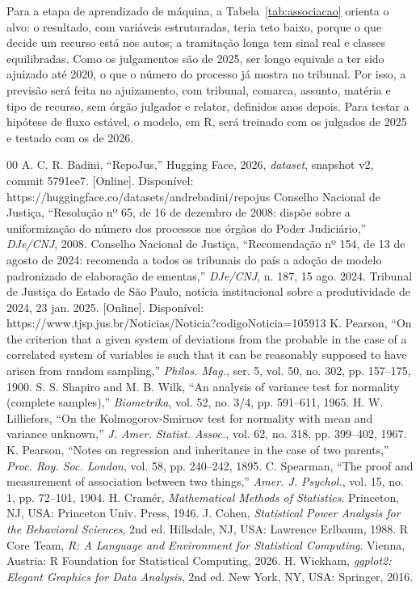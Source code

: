 \documentclass[conference]{IEEEtran}
\begin{document}
Para a etapa de aprendizado de máquina, a Tabela~\ref{tab:associacao} orienta
o alvo: o resultado, com variáveis estruturadas, teria teto baixo, porque o que
decide um recurso está nos autos; a tramitação longa tem sinal real e classes
equilibradas. Como os julgamentos são de 2025, ser longo equivale a ter sido
ajuizado até 2020, o que o número do processo já mostra no tribunal. Por
isso, a previsão será feita no ajuizamento, com tribunal, comarca, assunto,
matéria e tipo de recurso, sem órgão julgador e relator, definidos anos depois.
Para testar a hipótese de fluxo estável, o modelo, em R, será treinado com os
julgados de 2025 e testado com os de 2026.

\begin{thebibliography}{00}
 A. C. R. Badini, ``RepoJus,'' Hugging Face, 2026, \textit{dataset}, snapshot v2, commit 5791ee7. [Online]. Disponível: https://huggingface.co/\allowbreak datasets/\allowbreak andrebadini/\allowbreak repojus
 Conselho Nacional de Justiça, ``Resolução nº 65, de 16 de dezembro de 2008: dispõe sobre a uniformização do número dos processos nos órgãos do Poder Judiciário,'' \textit{DJe/CNJ}, 2008.
 Conselho Nacional de Justiça, ``Recomendação nº 154, de 13 de agosto de 2024: recomenda a todos os tribunais do país a adoção de modelo padronizado de elaboração de ementas,'' \textit{DJe/CNJ}, n. 187, 15 ago. 2024.
 Tribunal de Justiça do Estado de São Paulo, notícia institucional sobre a produtividade de 2024, 23 jan. 2025. [Online]. Disponível: https://www.tjsp.jus.br/\allowbreak Noticias/\allowbreak Noticia?codigoNoticia=105913
 K. Pearson, ``On the criterion that a given system of deviations from the probable in the case of a correlated system of variables is such that it can be reasonably supposed to have arisen from random sampling,'' \textit{Philos. Mag.}, ser. 5, vol. 50, no. 302, pp. 157--175, 1900.
 S. S. Shapiro and M. B. Wilk, ``An analysis of variance test for normality (complete samples),'' \textit{Biometrika}, vol. 52, no. 3/4, pp. 591--611, 1965.
 H. W. Lilliefors, ``On the Kolmogorov-Smirnov test for normality with mean and variance unknown,'' \textit{J. Amer. Statist. Assoc.}, vol. 62, no. 318, pp. 399--402, 1967.
 K. Pearson, ``Notes on regression and inheritance in the case of two parents,'' \textit{Proc. Roy. Soc. London}, vol. 58, pp. 240--242, 1895.
 C. Spearman, ``The proof and measurement of association between two things,'' \textit{Amer. J. Psychol.}, vol. 15, no. 1, pp. 72--101, 1904.
 H. Cramér, \textit{Mathematical Methods of Statistics}. Princeton, NJ, USA: Princeton Univ. Press, 1946.
 J. Cohen, \textit{Statistical Power Analysis for the Behavioral Sciences}, 2nd ed. Hillsdale, NJ, USA: Lawrence Erlbaum, 1988.
 R Core Team, \textit{R: A Language and Environment for Statistical Computing}. Vienna, Austria: R Foundation for Statistical Computing, 2026.
 H. Wickham, \textit{ggplot2: Elegant Graphics for Data Analysis}, 2nd ed. New York, NY, USA: Springer, 2016.
\end{thebibliography}
\end{document}
